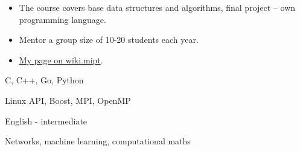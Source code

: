\documentclass[10pt,a4paper,normalphoto]{altacv}
\begin{document}
\medskip

\begin{itemize}
    \item The course covers base data structures and algorithms, final project -- own programming language.
    \item Mentor a group size of 10-20 students each year.
    \item \href{https://wiki.mipt.tech/index.php/%D0%94%D1%83%D1%80%D0%BD%D0%BE%D0%B2%5F%D0%90%D0%BB%D0%B5%D0%BA%D1%81%D0%B5%D0%B9%5F%D0%9D%D0%B8%D0%BA%D0%BE%D0%BB%D0%B0%D0%B5%D0%B2%D0%B8%D1%87}{My page on wiki.mipt}.
\end{itemize}

\divider

C, C++, Go, Python
\medskip

Linux API, Boost, MPI, OpenMP
\medskip

English - intermediate
\medskip

Networks, machine learning, computational maths

\clearpage
\end{document}

